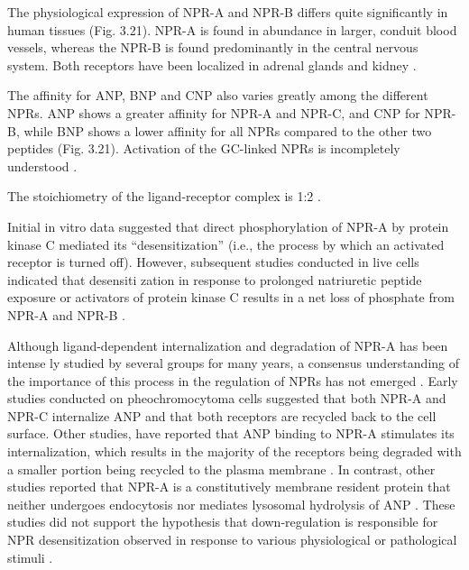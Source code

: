 \documentclass[14pt,a4paper,onecolumn]{extarticle}
\begin{document}
The physiological expression of NPR-A and NPR-B differs quite significantly in human tissues (Fig. 3.21). NPR-A is found in abundance in larger, conduit blood vessels, whereas the NPR-B is found predominantly in the central nervous system. Both receptors have been localized in adrenal glands and kidney \citep{168}.



The affinity for ANP, BNP and CNP also varies greatly among the different NPRs.  ANP shows a greater affinity for NPR-A and NPR-C, and CNP for NPR-B, while BNP shows a lower affinity for all NPRs compared to the other two peptides (Fig. 3.21).  Activation of the GC-linked NPRs is incompletely understood \citep{172}.

The stoichiometry of the ligand-receptor complex is 1:2 \citep{177}.

Initial in vitro data suggested that direct phosphorylation of NPR-A by protein kinase C mediated its “desensitization” (i.e., the process by which an activated receptor is turned off). However, subsequent studies conducted in live cells indicated that desensiti zation in response to prolonged natriuretic peptide exposure or activators of protein kinase C results in a net loss of phosphate from NPR-A and NPR-B \citep{182}.



Although ligand-dependent internalization and degradation of NPR-A has been intense ly studied by several groups for many years, a consensus understanding of the importance of this process in the regulation of NPRs has not emerged \citep{182}. Early studies conducted on pheochromocytoma cells suggested that both NPR-A and NPR-C internalize ANP and that both receptors are recycled back to the cell surface. Other studies, have reported that ANP binding to NPR-A stimulates its internalization, which results in the majority of the receptors being degraded with a smaller portion being recycled to the plasma membrane \citep{186} \citep{187}. In contrast, other studies reported that NPR-A is a constitutively membrane resident protein that neither undergoes endocytosis nor mediates lysosomal hydrolysis of ANP \citep{189}.  These studies did not support the hypothesis that down-regulation is responsible for NPR desensitization observed in response to various physiological or pathological stimuli \citep{182}.
\end{document}
